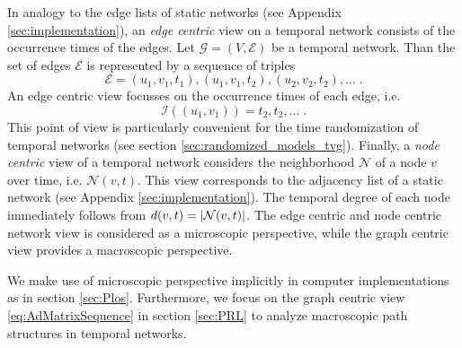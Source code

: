 In analogy to the edge lists of static networks (see Appendix \ref{sec:implementation}), an \emph{edge centric} view on a temporal network consists of the occurrence times of the edges.
Let $\mathcal{G}=(V,\mathcal{E})$ be a temporal network.
Than the set of edges $\mathcal{E}$ is represented by a sequence of triples
\begin{equation*}%
\mathcal{E}=(u_1,v_1,t_1),(u_1,v_1,t_2),(u_2,v_2,t_2),\dots \;.
\end{equation*}
An edge centric view focusses on the occurrence times of each edge, i.e.
\[
\mathcal{I}((u_1,v_1))=t_2,t_2,\dots \; .
\]
This point of view is particularly convenient for the time randomization of temporal networks (see section \ref{sec:randomized_models_tvg}).
Finally, a \emph{node centric} view of a temporal network considers the neighborhood $\mathcal{N}$ of a node $v$ over time, i.e. $\mathcal{N}(v,t)$.
This view corresponds to the adjacency list of a static network (see Appendix \ref{sec:implementation}).
The temporal degree of each node immediately follows from $d(v,t)=\left| \mathcal{N}(v,t) \right|$.
The edge centric and node centric network view is considered as a microscopic perspective, while the graph centric view provides a macroscopic perspective.

We make use of microscopic perspective implicitly in computer implementations as in section \ref{sec:Plos}.
Furthermore, we focus on the graph centric view \eqref{eq:AdMatrixSequence} in section \ref{sec:PRL} to analyze macroscopic path structures in temporal networks.

